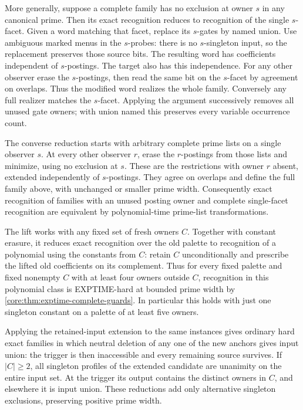 More generally, suppose a complete family has no
exclusion at owner $s$ in any canonical prime.
Then its exact recognition reduces to recognition
of the single $s$-facet. Given a word matching
that facet, replace its $s$-gates by named union.
Use ambiguous marked menus in the $s$-probes:
there is no $s$-singleton input, so the replacement
preserves those source bits. The resulting word
has coefficients independent of $s$-postings.
The target also has this independence. For any
other observer erase the $s$-postings, then read
the same bit on the $s$-facet by agreement on
overlaps. Thus the modified word realizes the
whole family. Conversely any full realizer
matches the $s$-facet. Applying the argument
successively removes all unused gate owners;
with union named this preserves every variable
occurrence count.

The converse reduction starts with arbitrary
complete prime lists on a single observer $s$.
At every other observer $r$, erase the $r$-postings
from those lists and minimize, using no exclusion
at $s$. These are the restrictions with owner $r$
absent, extended independently of $s$-postings.
They agree on overlaps and define the full family
above, with unchanged or smaller prime width.
Consequently exact recognition of families with
an unused posting owner and complete single-facet
recognition are equivalent by polynomial-time
prime-list transformations.

The lift works with any fixed set of fresh owners
$C$. Together with constant erasure, it reduces
exact recognition over the old palette to
recognition of a polynomial using the constants
from $C$: retain $C$ unconditionally and prescribe
the lifted old coefficients on its complement.
Thus for every fixed palette and fixed nonempty
$C$ with at least four owners outside $C$,
recognition in this polynomial class is EXPTIME-hard
at bounded prime width by
\cref{core:thm:exptime-complete-guards}. In particular
this holds with just one singleton constant on a
palette of at least five owners.

Applying the retained-input extension to the same
instances gives ordinary hard exact families in
which neutral deletion of any one of the new
anchors gives input union: the trigger is then
inaccessible and every remaining source survives.
If $|C|\ge2$, all singleton profiles of the extended
candidate are unanimity on the entire input set.
At the trigger its output contains the distinct
owners in $C$, and elsewhere it is input union.
These reductions add only alternative singleton
exclusions, preserving positive prime width.

